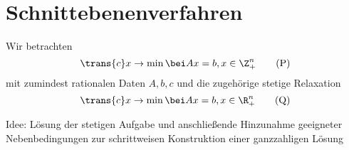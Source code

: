 \section{Schnittebenenverfahren}

Wir betrachten 
\begin{equation*}
	\trans{c} x \to \min \bei Ax=b, x \in \Z_+^n 
	\tag{P} \label{eq: 4-4-p}
\end{equation*}
mit zumindest rationalen Daten $A,b,c$ und die zugehörige stetige Relaxation
\begin{equation*}
	\trans{c} x \to \min \bei Ax=b, x \in \R_+^n 
	\tag{Q} \label{eq: 4-4-q}
\end{equation*}

Idee: Lösung der stetigen Aufgabe und anschließende Hinzunahme geeigneter Nebenbedingungen zur schrittweisen Konstruktion einer ganzzahligen Lösung

